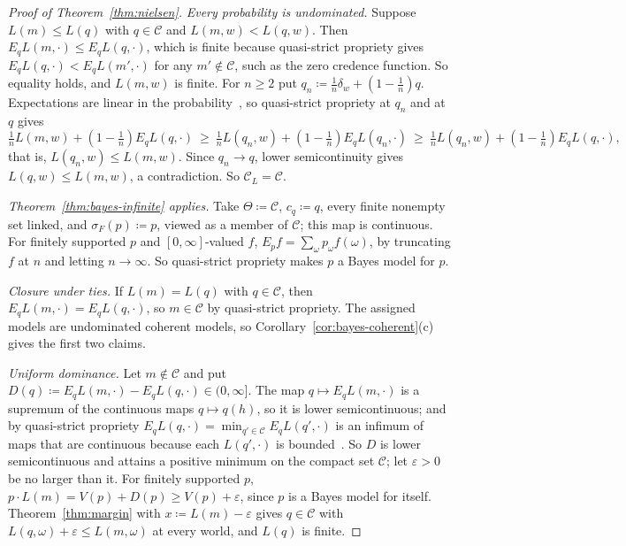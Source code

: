 \documentclass[11pt]{article}
\theoremstyle{definition}
\theoremstyle{remark}
\newcommand{\C}{\mathcal C}
\begin{document}
\begin{proof}[Proof of Theorem~\ref{thm:nielsen}]
\emph{Every probability is undominated.} Suppose $L(m)\le L(q)$ with $q\in\C$ and $L(m,w)<L(q,w)$. Then $E_qL(m,\cdot)\le E_qL(q,\cdot)$, which is finite because quasi-strict propriety gives $E_qL(q,\cdot)<E_qL(m',\cdot)$ for any $m'\notin\C$, such as the zero credence function. So equality holds, and $L(m,w)$ is finite. For $n\ge2$ put $q_n\coloneqq\frac1n\delta_w+(1-\frac1n)q$. Expectations are linear in the probability~\cite[Appendix~A, Proposition~1]{Nielsen}, so quasi-strict propriety at $q_n$ and at $q$ gives
\[
\tfrac1nL(m,w)+(1-\tfrac1n)E_qL(q,\cdot)\ \ge\ \tfrac1nL(q_n,w)+(1-\tfrac1n)E_qL(q_n,\cdot)\ \ge\ \tfrac1nL(q_n,w)+(1-\tfrac1n)E_qL(q,\cdot),
\]
that is, $L(q_n,w)\le L(m,w)$. Since $q_n\to q$, lower semicontinuity gives $L(q,w)\le L(m,w)$, a contradiction. So $\C_L=\C$.

\emph{Theorem~\ref{thm:bayes-infinite} applies.} Take $\Theta\coloneqq\C$, $c_q\coloneqq q$, every finite nonempty set linked, and $\sigma_F(p)\coloneqq p$, viewed as a member of $\C$; this map is continuous. For finitely supported $p$ and $[0,\infty]$-valued $f$, $E_pf=\sum_\omega p_\omega f(\omega)$, by truncating $f$ at $n$ and letting $n\to\infty$. So quasi-strict propriety makes $p$ a Bayes model for $p$.

\emph{Closure under ties.} If $L(m)=L(q)$ with $q\in\C$, then $E_qL(m,\cdot)=E_qL(q,\cdot)$, so $m\in\C$ by quasi-strict propriety. The assigned models are undominated coherent models, so Corollary~\ref{cor:bayes-coherent}(c) gives the first two claims.

\emph{Uniform dominance.} Let $m\notin\C$ and put $D(q)\coloneqq E_qL(m,\cdot)-E_qL(q,\cdot)\in(0,\infty]$. The map $q\mapsto E_qL(m,\cdot)$ is a supremum of the continuous maps $q\mapsto q(h)$, so it is lower semicontinuous; and by quasi-strict propriety $E_qL(q,\cdot)=\min_{q'\in\C}E_qL(q',\cdot)$ is an infimum of maps that are continuous because each $L(q',\cdot)$ is bounded~\cite[Lemmas~1 and~3]{Nielsen}. So $D$ is lower semicontinuous and attains a positive minimum on the compact set $\C$; let $\varepsilon>0$ be no larger than it. For finitely supported $p$, $p\cdot L(m)=V(p)+D(p)\ge V(p)+\varepsilon$, since $p$ is a Bayes model for itself. Theorem~\ref{thm:margin} with $x\coloneqq L(m)-\varepsilon$ gives $q\in\C$ with $L(q,\omega)+\varepsilon\le L(m,\omega)$ at every world, and $L(q)$ is finite.
\end{proof}
\end{document}
